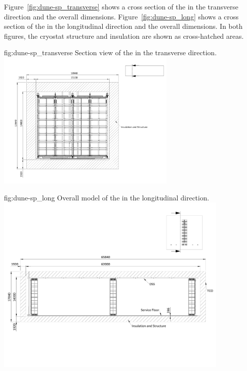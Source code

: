 Figure~\ref{fig:dune-sp_transverse} shows a cross section of the
 in the transverse direction and the overall dimensions.
Figure~\ref{fig:dune-sp_long} shows a cross section of the
 in the longitudinal direction and the overall
dimensions. In both figures, the cryostat structure and insulation are
shown as cross-hatched areas.
\begin{dunefigure}{fig:dune-sp_transverse}
  {Section view of the  in the transverse
    direction.}
  \includegraphics[width=0.65\textwidth]{graphics/SP_transverse_section.pdf}
\end{dunefigure}
\begin{dunefigure}{fig:dune-sp_long}
  {Overall model of the  in the longitudinal direction.}
  \includegraphics[width=0.85\textwidth]{graphics/SP_longitudinal_section.pdf}
\end{dunefigure}



